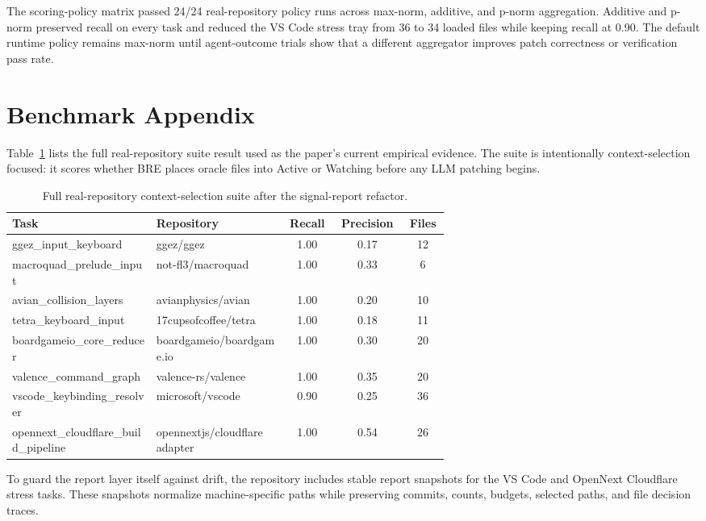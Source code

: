 \documentclass[11pt,onecolumn]{article}
\begin{document}
The scoring-policy matrix passed 24/24 real-repository policy runs across max-norm, additive, and p-norm aggregation. Additive and p-norm preserved recall on every task and reduced the VS Code stress tray from 36 to 34 loaded files while keeping recall at 0.90. The default runtime policy remains max-norm until agent-outcome trials show that a different aggregator improves patch correctness or verification pass rate.

\section{Benchmark Appendix}
Table~\ref{tab:realrepoappendix} lists the full real-repository suite result used as the paper's current empirical evidence. The suite is intentionally context-selection focused: it scores whether BRE places oracle files into Active or Watching before any LLM patching begins.

\begin{table}[h]
\centering
{\small
\setlength{\tabcolsep}{4pt}
\begin{tabular}{p{0.33\linewidth}p{0.30\linewidth}ccc}
\toprule
Task & Repository & Recall & Precision & Files \\
\midrule
ggez\_input\_keyboard & ggez/ggez & 1.00 & 0.17 & 12 \\
macroquad\_prelude\_input & not-fl3/macroquad & 1.00 & 0.33 & 6 \\
avian\_collision\_layers & avianphysics/avian & 1.00 & 0.20 & 10 \\
tetra\_keyboard\_input & 17cupsofcoffee/tetra & 1.00 & 0.18 & 11 \\
boardgameio\_core\_reducer & boardgameio/boardgame.io & 1.00 & 0.30 & 20 \\
valence\_command\_graph & valence-rs/valence & 1.00 & 0.35 & 20 \\
vscode\_keybinding\_resolver & microsoft/vscode & 0.90 & 0.25 & 36 \\
opennext\_cloudflare\_build\_pipeline & opennextjs/cloudflare adapter & 1.00 & 0.54 & 26 \\
\bottomrule
\end{tabular}
}
\caption{Full real-repository context-selection suite after the signal-report refactor.}
\label{tab:realrepoappendix}
\end{table}

To guard the report layer itself against drift, the repository includes stable report snapshots for the VS Code and OpenNext Cloudflare stress tasks. These snapshots normalize machine-specific paths while preserving commits, counts, budgets, selected paths, and file decision traces.
\end{document}
